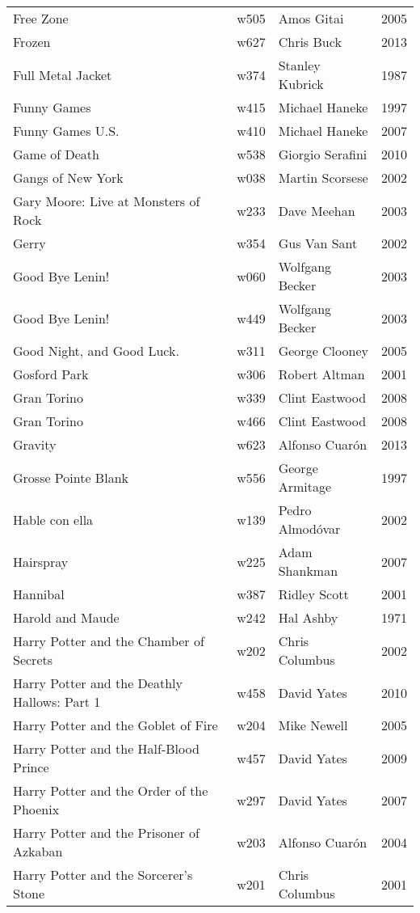 \documentclass{article}
\begin{document}
\begin {center}
\begin{longtable}{p{10cm} l l l}
Free Zone & w505 & Amos Gitai & 2005 \\
Frozen & w627 & Chris Buck & 2013 \\
Full Metal Jacket & w374 & Stanley Kubrick & 1987 \\
Funny Games & w415 & Michael Haneke & 1997 \\
Funny Games U.S. & w410 & Michael Haneke & 2007 \\
Game of Death & w538 & Giorgio Serafini & 2010 \\
Gangs of New York & w038 & Martin Scorsese & 2002 \\
Gary Moore: Live at Monsters of Rock & w233 & Dave Meehan & 2003 \\
Gerry & w354 & Gus Van Sant & 2002 \\
Good Bye Lenin! & w060 & Wolfgang Becker & 2003 \\
Good Bye Lenin! & w449 & Wolfgang Becker & 2003 \\
Good Night, and Good Luck. & w311 & George Clooney & 2005 \\
Gosford Park & w306 & Robert Altman & 2001 \\
Gran Torino & w339 & Clint Eastwood & 2008 \\
Gran Torino & w466 & Clint Eastwood & 2008 \\
Gravity & w623 & Alfonso Cuarón & 2013 \\
Grosse Pointe Blank & w556 & George Armitage & 1997 \\
Hable con ella & w139 & Pedro Almodóvar & 2002 \\
Hairspray & w225 & Adam Shankman & 2007 \\
Hannibal & w387 & Ridley Scott & 2001 \\
Harold and Maude & w242 & Hal Ashby & 1971 \\
Harry Potter and the Chamber of Secrets & w202 & Chris Columbus & 2002 \\
Harry Potter and the Deathly Hallows: Part 1 & w458 & David Yates & 2010 \\
Harry Potter and the Goblet of Fire & w204 & Mike Newell & 2005 \\
Harry Potter and the Half-Blood Prince & w457 & David Yates & 2009 \\
Harry Potter and the Order of the Phoenix & w297 & David Yates & 2007 \\
Harry Potter and the Prisoner of Azkaban & w203 & Alfonso Cuarón & 2004 \\
Harry Potter and the Sorcerer's Stone & w201 & Chris Columbus & 2001 \\

\end{longtable}
\end{center}
\end{document}
